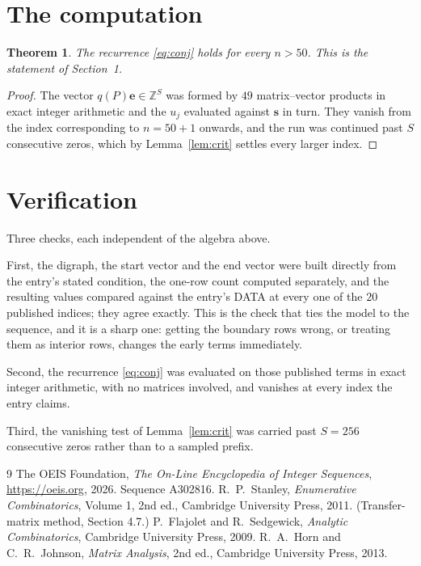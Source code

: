 \documentclass[11pt,a4paper]{article}
\theoremstyle{plain}
\newtheorem{theorem}{Theorem}
\theoremstyle{definition}
\begin{document}
\section{The computation}

\begin{theorem}
The recurrence \eqref{eq:conj} holds for every $n>50$. This is the statement of
Section~1.
\end{theorem}

\begin{proof}
The vector $q(P)\mathbf{e}\in\mathbb{Z}^{S}$ was formed by $49$ matrix--vector
products in exact integer arithmetic and the $u_j$ evaluated against $\mathbf{s}$ in turn.
They vanish from the index corresponding to $n=50+1$ onwards, and the run was continued
past $S$ consecutive zeros, which by Lemma~\ref{lem:crit} settles every larger index.
\end{proof}

\section{Verification}

Three checks, each independent of the algebra above.

First, the digraph, the start vector and the end vector were built directly from the
entry's stated condition, the one-row count computed separately, and the resulting values
compared against the entry's DATA at every one of the $20$ published indices; they
agree exactly. This is the check that ties the model to the sequence, and it is a sharp one:
getting the boundary rows wrong, or treating them as interior rows, changes the early terms
immediately.

Second, the recurrence \eqref{eq:conj} was evaluated on those published terms in exact
integer arithmetic, with no matrices involved, and vanishes at every index the entry claims.

Third, the vanishing test of Lemma~\ref{lem:crit} was carried past $S=256$ consecutive
zeros rather than to a sampled prefix.

\begin{thebibliography}{9}
 The OEIS Foundation, \emph{The On-Line Encyclopedia of Integer
Sequences}, \url{https://oeis.org}, 2026. Sequence A302816.
 R.~P.~Stanley, \emph{Enumerative Combinatorics}, Volume 1, 2nd ed.,
Cambridge University Press, 2011. (Transfer-matrix method, Section 4.7.)
 P.~Flajolet and R.~Sedgewick, \emph{Analytic Combinatorics}, Cambridge
University Press, 2009.
 R.~A.~Horn and C.~R.~Johnson, \emph{Matrix Analysis}, 2nd ed., Cambridge
University Press, 2013.
\end{thebibliography}
\end{document}
